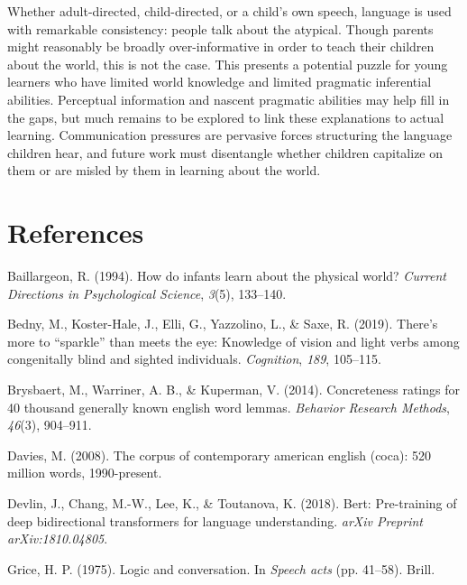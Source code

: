 \documentclass[10pt, letterpaper]{article}
\begin{document}
Whether adult-directed, child-directed, or a child's own speech,
language is used with remarkable consistency: people talk about the
atypical. Though parents might reasonably be broadly over-informative in
order to teach their children about the world, this is not the case.
This presents a potential puzzle for young learners who have limited
world knowledge and limited pragmatic inferential abilities. Perceptual
information and nascent pragmatic abilities may help fill in the gaps,
but much remains to be explored to link these explanations to actual
learning. Communication pressures are pervasive forces structuring the
language children hear, and future work must disentangle whether
children capitalize on them or are misled by them in learning about the
world.

\hypertarget{references}{%
\section{References}\label{references}}

\setlength{\parindent}{-0.1in} 
\setlength{\leftskip}{0.125in}

\noindent

\hypertarget{refs}{}
\leavevmode\hypertarget{ref-baillargeon1994}{}%
Baillargeon, R. (1994). How do infants learn about the physical world?
\emph{Current Directions in Psychological Science}, \emph{3}(5),
133--140.

\leavevmode\hypertarget{ref-bedny2019}{}%
Bedny, M., Koster-Hale, J., Elli, G., Yazzolino, L., \& Saxe, R. (2019).
There's more to ``sparkle'' than meets the eye: Knowledge of vision and
light verbs among congenitally blind and sighted individuals.
\emph{Cognition}, \emph{189}, 105--115.

\leavevmode\hypertarget{ref-brysbaert2014}{}%
Brysbaert, M., Warriner, A. B., \& Kuperman, V. (2014). Concreteness
ratings for 40 thousand generally known english word lemmas.
\emph{Behavior Research Methods}, \emph{46}(3), 904--911.

\leavevmode\hypertarget{ref-davies2008}{}%
Davies, M. (2008). The corpus of contemporary american english (coca):
520 million words, 1990-present.

\leavevmode\hypertarget{ref-devlin2018}{}%
Devlin, J., Chang, M.-W., Lee, K., \& Toutanova, K. (2018). Bert:
Pre-training of deep bidirectional transformers for language
understanding. \emph{arXiv Preprint arXiv:1810.04805}.

\leavevmode\hypertarget{ref-grice1975}{}%
Grice, H. P. (1975). Logic and conversation. In \emph{Speech acts} (pp.
41--58). Brill.
\end{document}
